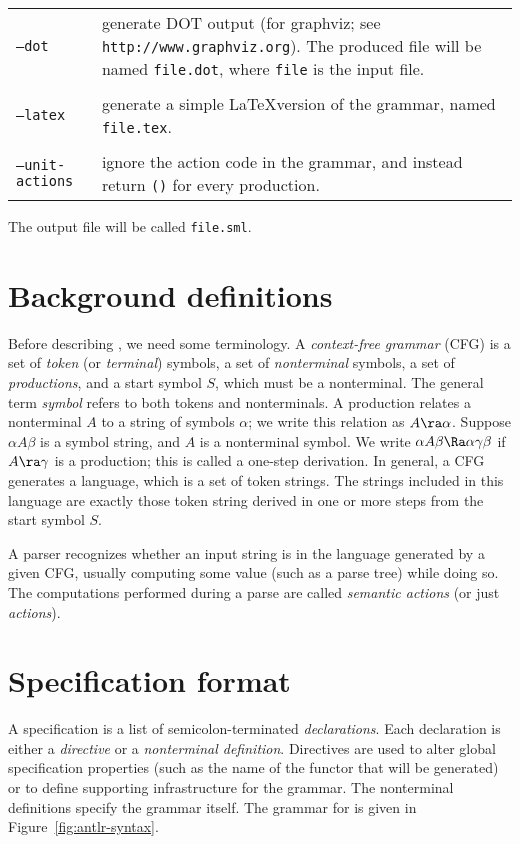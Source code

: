 \vskip 12pt
\begin{tabular}{lp{}}
  \texttt{--dot} & generate DOT output (for graphviz; see \texttt{http://www.graphviz.org}).  The produced file will be named \texttt{file.dot}, where \texttt{file} is the input file. \\
  \\
  \texttt{--latex} & generate a simple \LaTeX version of the grammar, named \texttt{file.tex}. \\
  \\
  \texttt{--unit-actions} & ignore the action code in the grammar, and instead return \texttt{()} for every production.
\end{tabular}

\vskip 10pt \noindent
The output file will be called \texttt{file.sml}.

\section{Background definitions}

Before describing \antlr{}, we need some terminology.  A \emph{context-free grammar} (CFG) is a set of \emph{token} (or \emph{terminal}) symbols, a set of \emph{nonterminal} symbols, a set of \emph{productions}, and a start symbol $S$, which must be a nonterminal.  
The general term \emph{symbol} refers to both tokens and nonterminals.  A production relates a nonterminal $A$ to a string of symbols $\alpha$; we write this relation as $A \ra \alpha$.  Suppose $\alpha A \beta$ is a symbol string, and $A$ is a nonterminal symbol.  We write $\alpha A \beta \Ra \alpha \gamma \beta$ if $A \ra \gamma$ is a production; this is called a one-step derivation.  In general, a CFG generates a language, which is a set of token strings.  The strings included in this language are exactly those token string derived in one or more steps from the start symbol $S$.

A parser recognizes whether an input string is in the language generated by a given CFG, usually computing some value (such as a parse tree) while doing so.  The computations performed during a parse are called \emph{semantic actions} (or just \emph{actions}).

\section{Specification format}\label{sec:antlr-spec}

A \antlr{} specification is a list of semicolon-terminated \emph{declarations}.  Each declaration is either a \emph{directive} or a \emph{nonterminal definition}.  Directives are used to alter global specification properties (such as the name of the functor that will be generated) or to define supporting infrastructure for the grammar.  The nonterminal definitions specify the grammar itself.  The grammar for \antlr{} is given in Figure~\ref{fig:antlr-syntax}.


